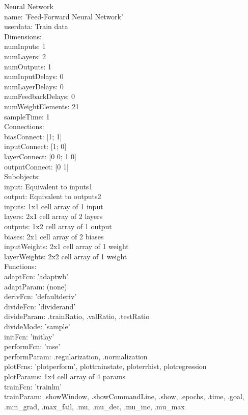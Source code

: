 \documentclass[12pt]{report}
\begin{document}
Neural Network\\
name: 'Feed-Forward Neural Network'\\
userdata: Train data\\

Dimensions:\\
numInputs: 1\\
numLayers: 2\\
numOutputs: 1\\
numInputDelays: 0\\
numLayerDelays: 0\\
numFeedbackDelays: 0\\
numWeightElements: 21\\
sampleTime: 1\\

Connections:\\{\tiny }
biasConnect: [1; 1]\\
inputConnect: [1; 0]\\
layerConnect: [0 0; 1 0]\\
outputConnect: [0 1]\\

Subobjects:\\
input: Equivalent to inputs{1}\\
output: Equivalent to outputs{2}\\
inputs: {1x1 cell array of 1 input}\\
layers: {2x1 cell array of 2 layers}\\
outputs: {1x2 cell array of 1 output}\\
biases: {2x1 cell array of 2 biases}\\
inputWeights: {2x1 cell array of 1 weight}\\
layerWeights: {2x2 cell array of 1 weight}\\

Functions:\\
adaptFcn: 'adaptwb'\\
adaptParam: (none)\\
derivFcn: 'defaultderiv'\\
divideFcn: 'dividerand'\\
divideParam: .trainRatio, .valRatio, .testRatio\\
divideMode: 'sample'\\
initFcn: 'initlay'\\
performFcn: 'mse'\\
performParam: .regularization, .normalization\\
plotFcns: {'plotperform', plottrainstate, ploterrhist, plotregression}\\
plotParams: {1x4 cell array of 4 params}\\
trainFcn: 'trainlm'\\
trainParam: .showWindow, .showCommandLine, .show, .epochs, .time, .goal, .min\_grad, .max\_fail, .mu, .mu\_dec, .mu\_inc, .mu\_max\\
\end{document}
